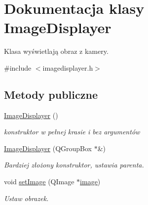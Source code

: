 \hypertarget{class_image_displayer}{
\section{Dokumentacja klasy ImageDisplayer}
\label{class_image_displayer}
}


Klasa wyświetlają obraz z kamery.  




{\ttfamily \#include $<$imagedisplayer.h$>$}

\subsection*{Metody publiczne}
\begin{DoxyCompactItemize}
\item 
\hypertarget{class_image_displayer_ab9c0301e7ed29ff2debf5e7f11c95aff}{
\hyperlink{class_image_displayer_ab9c0301e7ed29ff2debf5e7f11c95aff}{ImageDisplayer} ()}
\label{class_image_displayer_ab9c0301e7ed29ff2debf5e7f11c95aff}

\begin{DoxyCompactList}\small\item\em konstruktor w pełnej krasie i bez argumentów \item\end{DoxyCompactList}\item 
\hypertarget{class_image_displayer_ade6ee3928461e16ae867a744b647121e}{
\hyperlink{class_image_displayer_ade6ee3928461e16ae867a744b647121e}{ImageDisplayer} (QGroupBox $\ast$\&)}
\label{class_image_displayer_ade6ee3928461e16ae867a744b647121e}

\begin{DoxyCompactList}\small\item\em Bardziej złożony konstruktor, ustawia parenta. \item\end{DoxyCompactList}\item 
void \hyperlink{class_image_displayer_aa801ce426124fdd201a56e44e8b24610}{setImage} (QImage $\ast$\hyperlink{class_image_displayer_a425fc06c5474754684575cd80e378bd1}{image})
\begin{DoxyCompactList}\small\item\em Ustaw obrazek. \item\end{DoxyCompactList}\end{DoxyCompactItemize}
